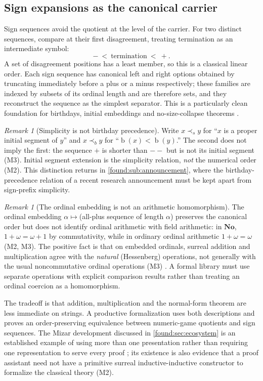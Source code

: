 \documentclass[11pt,letterpaper]{article}
\numberwithin{equation}{section}
\theoremstyle{definition}
\theoremstyle{remark}
\newtheorem{remark}[theorem]{Remark}
\newcommand{\No}{\mathbf{No}}
\newcommand{\bd}{\operatorname{b}}
\begin{document}
\subsection{Sign expansions as the canonical carrier}
\label{found:sub:signs}
Sign sequences avoid the quotient at the level of the carrier. For two distinct
sequences, compare at their first disagreement, treating termination as an
intermediate symbol:
\[
 -\ <\ \text{termination}\ <\ +.
\]
A set of disagreement positions has a least member, so this is a classical
linear order. Each sign sequence has canonical left and right options obtained
by truncating immediately before a plus or a minus respectively; these families
are indexed by subsets of its ordinal length and are therefore sets, and they
reconstruct the sequence as the simplest separator. This is a particularly
clean foundation for birthdays, initial embeddings and no-size-collapse
theorems \cite{found:Gonshor,found:Ehrlich2001}.

\begin{remark}[Simplicity is not birthday precedence]\label{found:rem:simplicity}
Write $x\prec_s y$ for ``$x$ is a proper initial segment of $y$'' and
$x\prec_b y$ for ``$\bd(x)<\bd(y)$.'' The second does not imply the first: the
sequence $+$ is shorter than $--$ but is not its initial segment (M3). Initial
segment extension is the simplicity relation, \emph{not} the numerical order
(M2). This distinction returns in \cref{found:sub:announcement}, where the
birthday-precedence relation of a recent research announcement must be kept
apart from sign-prefix simplicity.
\end{remark}

\begin{remark}[The ordinal embedding is not an arithmetic homomorphism]\label{found:rem:ordinals}
The ordinal embedding $\alpha\mapsto{}$(all-plus sequence of length $\alpha$)
preserves the canonical order but does not identify ordinal arithmetic with
field arithmetic: in $\No$, $1+\omega=\omega+1$ by commutativity, while in
ordinary ordinal arithmetic $1+\omega=\omega$ (M2, M3). The positive fact is
that on embedded ordinals, surreal addition and multiplication agree with the
\emph{natural} (Hessenberg) operations, not generally with the usual
noncommutative ordinal operations (M3) \cite{found:Conway}. A formal library
must use separate operations with explicit comparison results rather than
treating an ordinal coercion as a homomorphism.
\end{remark}

The tradeoff is that addition, multiplication and the normal-form theorem are
less immediate on strings. A productive formalization uses both descriptions and
proves an order-preserving equivalence between numeric-game quotients and sign
sequences. The Mizar development discussed in \cref{found:sec:ecosystem} is an
established example of using more than one presentation rather than requiring
one representation to serve every proof \cite{found:PakKaliszyk}; its existence
is also evidence that a proof assistant need not have a primitive surreal
inductive-inductive constructor to formalize the classical theory (M2).
\end{document}
